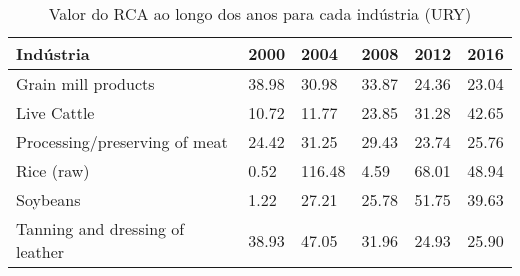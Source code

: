 \begin{table}
\centering
\caption{Valor do RCA ao longo dos anos para cada indústria (URY)}
\begin{tabular}{p{6cm}p{1.5cm}p{1.5cm}p{1.5cm}p{1.5cm}p{1.5cm}}
\toprule
                      Indústria &  2000 &   2004 &  2008 &  2012 &  2016 \\
\midrule
            Grain mill products & 38.98 &  30.98 & 33.87 & 24.36 & 23.04 \\
                    Live Cattle & 10.72 &  11.77 & 23.85 & 31.28 & 42.65 \\
  Processing/preserving of meat & 24.42 &  31.25 & 29.43 & 23.74 & 25.76 \\
                     Rice (raw) &  0.52 & 116.48 &  4.59 & 68.01 & 48.94 \\
                       Soybeans &  1.22 &  27.21 & 25.78 & 51.75 & 39.63 \\
Tanning and dressing of leather & 38.93 &  47.05 & 31.96 & 24.93 & 25.90 \\
\bottomrule
\end{tabular}
\end{table}
